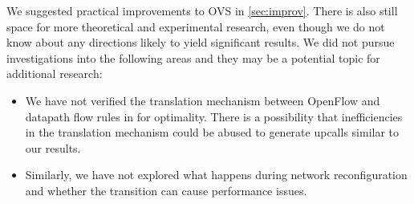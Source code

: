 We suggested practical improvements to OVS in \cref{sec:improv}. There is also still space for more theoretical and experimental research, even though we do not know about any directions likely to yield significant results. We did not pursue investigations into the following areas and they may be a potential topic for additional research:

\begin{itemize}
    \item We have not verified the translation mechanism between OpenFlow and datapath flow rules in  for optimality. There is a possibility that inefficiencies in the translation mechanism could be abused to generate upcalls similar to our results.

    \item Similarly, we have not explored what happens during network reconfiguration and whether the transition can cause performance issues.
\end{itemize}


